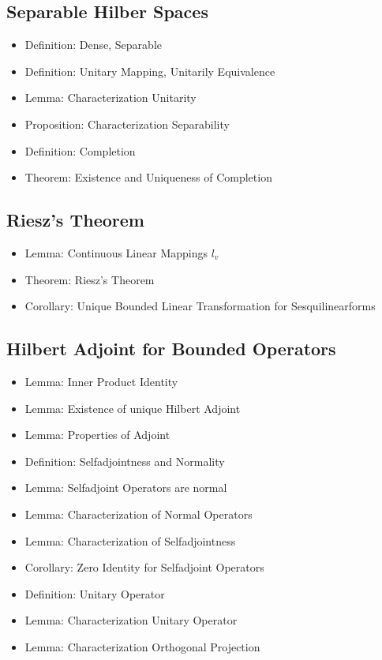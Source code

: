 \documentclass[8pt,twocolumn]{article}
\begin{document}
    \subsection{Separable Hilber Spaces} %
    \label{sub:separable_hilber_spaces}
      \begin{itemize}
        \item Definition: Dense, Separable
        \item Definition: Unitary Mapping, Unitarily Equivalence
        \item Lemma: Characterization Unitarity
        \item Proposition: Characterization Separability
        \item Definition: Completion
        \item Theorem: Existence and Uniqueness of Completion
      \end{itemize}

    \subsection{Riesz's Theorem} %
    \label{sub:riesz_s_theorem}
      \begin{itemize}
        \item Lemma: Continuous Linear Mappings $l_v$
        \item Theorem: Riesz's Theorem
        \item Corollary: Unique Bounded Linear Transformation for Sesquilinearforms
      \end{itemize}

    \subsection{Hilbert Adjoint for Bounded Operators} %
    \label{sub:hilbert_adjoint_for_bounded_operators}
      \begin{itemize}
        \item Lemma: Inner Product Identity
        \item Lemma: Existence of unique Hilbert Adjoint
        \item Lemma: Properties of Adjoint
        \item Definition: Selfadjointness and Normality
        \item Lemma: Selfadjoint Operators are normal
        \item Lemma: Characterization of Normal Operators
        \item Lemma: Characterization of Selfadjointness
        \item Corollary: Zero Identity for Selfadjoint Operators
        \item Definition: Unitary Operator
        \item Lemma: Characterization Unitary Operator
        \item Lemma: Characterization Orthogonal Projection
      \end{itemize}
\end{document}
